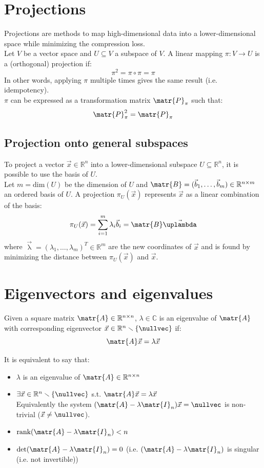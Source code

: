\section{Projections}
Projections are methods to map high-dimensional data into a lower-dimensional space 
while minimizing the compression loss.\\
Let $V$ be a vector space and $U \subseteq V$ a subspace of $V$.
A linear mapping $\pi: V \rightarrow U$ is a (orthogonal) projection if:
\[ \pi^2 = \pi \circ \pi = \pi \]
In other words, applying $\pi$ multiple times gives the same result (i.e. idempotency).\\
$\pi$ can be expressed as a transformation matrix $\matr{P}_\pi$ such that:
\[ \matr{P}_\pi^2 = \matr{P}_\pi \] 

\subsection{Projection onto general subspaces} 
To project a vector $\vec{x} \in \mathbb{R}^n$ into a lower-dimensional subspace $U \subseteq \mathbb{R}^n$,
it is possible to use the basis of $U$.\\
%
Let $m = \text{dim}(U)$ be the dimension of $U$ and 
$\matr{B} = (\vec{b}_1, \dots, \vec{b}_m) \in \mathbb{R}^{n \times m}$ an ordered basis of $U$.
A projection $\pi_U(\vec{x})$ represents $\vec{x}$ as a linear combination of the basis:
\[ \pi_U(\vec{x}) = \sum_{i=1}^{m} \lambda_i \vec{b}_i = \matr{B}\vec{\uplambda} \]
where $\vec{\uplambda} = (\lambda_1, \dots, \lambda_m)^T \in \mathbb{R}^{m}$ are the new coordinates of $\vec{x}$ 
and is found by minimizing the distance between $\pi_U(\vec{x})$ and $\vec{x}$.



\section{Eigenvectors and eigenvalues}

Given a square matrix $\matr{A} \in \mathbb{R}^{n \times n}$, 
$\lambda \in \mathbb{C}$ is an eigenvalue of $\matr{A}$ 
with corresponding eigenvector $\vec{x} \in \mathbb{R}^n \smallsetminus \{ \nullvec \}$ if: 
\[ \matr{A}\vec{x} = \lambda\vec{x} \]

It is equivalent to say that:
\begin{itemize}
    \item $\lambda$ is an eigenvalue of $\matr{A} \in \mathbb{R}^{n \times n}$
    \item $\exists \vec{x} \in \mathbb{R}^n \smallsetminus \{ \nullvec \}$ s.t. $\matr{A}\vec{x} = \lambda\vec{x}$ \\
        Equivalently the system $(\matr{A} - \lambda \matr{I}_n)\vec{x} = \nullvec$ is non-trivial ($\vec{x} \neq \nullvec$).
    \item $\text{rank}(\matr{A} - \lambda \matr{I}_n) < n$
    \item $\det(\matr{A} - \lambda \matr{I}_n) = 0$ (i.e. $(\matr{A} - \lambda \matr{I}_n)$ is singular {\footnotesize(i.e. not invertible)})
\end{itemize}


